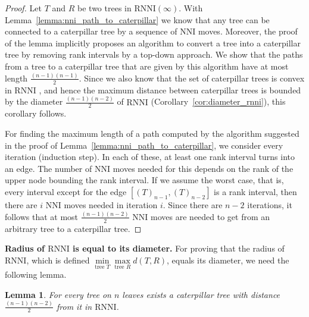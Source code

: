 \documentclass[11pt]{amsart}
\newtheorem{lemma}{Lemma}
\newcommand{\rnni}{\mathrm{RNNI}}
\newcommand{\nni}{\mathrm{NNI}}
\newcommand{\summary}[1]{\textbf{#1}} %
\begin{document}
\begin{proof}
	Let $T$ and $R$ be two trees in $\rnni(\infty)$.
	With Lemma~\ref{lemma:nni_path_to_caterpillar} we know that any tree can be connected to a caterpillar tree by a sequence of $\nni$ moves.
	Moreover, the proof of the lemma implicitly proposes an algorithm to convert a tree into a caterpillar tree by removing rank intervals by a top-down approach.
	We show that the paths from a tree to a caterpillar tree that are given by this algorithm have at most length $\frac{(n-1)(n-1)}{2}$.
	Since we also know that the set of caterpillar trees is convex in $\rnni$ , and hence the maximum distance between caterpillar trees is bounded by the diameter $\frac{(n-1)(n-2)}{2}$ of $\rnni$ (Corollary~\ref{cor:diameter_rnni}), this corollary follows.

	For finding the maximum length of a path computed by the algorithm suggested in the proof of Lemma~\ref{lemma:nni_path_to_caterpillar}, we consider every iteration (induction step).
	In each of these, at least one rank interval turns into an edge.
	The number of $\nni$ moves needed for this depends on the rank of the upper node bounding the rank interval.
	If we assume the worst case, that is, every interval except for the edge $[(T)_{n-1},(T)_{n-2}]$ is a rank interval, then there are $i$ $\nni$ moves needed in iteration $i$.
	Since there are $n-2$ iterations, it follows that at most $\frac{(n-1)(n-2)}{2}$ $\nni$ moves are needed to get from an arbitrary tree to a caterpillar tree.
\end{proof}

\summary{Radius of $\rnni$ is equal to its diameter.}
For proving that the radius of $\rnni$, which is defined $\min\limits_{\text{tree } T}\max\limits_{\text{tree }R} d(T,R)$, equals its diameter, we need the following lemma.

\begin{lemma}
	For every tree on $n$ leaves exists a caterpillar tree with distance $\frac{(n-1)(n-2)}{2}$ from it in $\rnni$.
	\label{lemma:max_dist_ctree}
\end{lemma}
\end{document}
